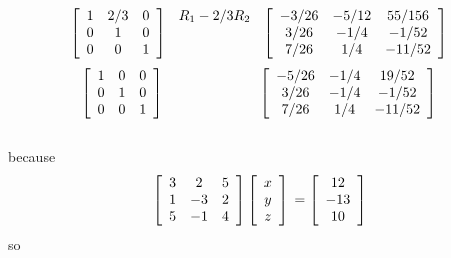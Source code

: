 \documentclass[a4paper, 12pt]{article}
\begin{document}
\[
\left[{
\begin{array}{ccc}
1 & 2/3 & 0 \\
0 & 1  & 0 \\
0 & 0  & 1
\end{array}
}
\right]
\begin{array}{ccc}
R_1 - 2/3 R_2 \\
\ \ \ \ \ \ \ \ \ \ \ \ \ \ \ \ \  \\
\ \ \ \ \ \ \ \ \ \ \ \ \ \ \ \ \  
\end{array}
\left[{
\begin{array}{ccc}
-3/26 & -5/12 & 55/156\\
3/26 & -1/4 & -1/52\\
7/26 & 1/4 & -11/52
\end{array} 
}
\right]\\ 
\] 
\[
\left[{
\begin{array}{ccc}
1 & 0 & 0 \\
0 & 1  & 0 \\
0 & 0  & 1
\end{array}
}
\right]
\begin{array}{ccc} 
\ \ \ \ \ \ \ \ \ \ \ \ \ \ \ \ \  \\
\ \ \ \ \ \ \ \ \ \ \ \ \ \ \ \ \  \\
\ \ \ \ \ \ \ \ \ \ \ \ \ \ \ \ \  
\end{array}
\left[{
\begin{array}{ccc}
-5/26 & -1/4 & 19/52\\
3/26 & -1/4 & -1/52\\
7/26 & 1/4 & -11/52
\end{array} 
} \right]\\ 
\] 
\\
because
\[
\left[{
\begin{array}{ccc}
3 & 2 & 5 \\
1 & -3  & 2\\
5 & -1  & 4
\end{array}
} \right]
\left[{
\begin{array}{c}
x \\
y \\
z
\end{array} 
} \right]\\ 
=
\left[{
\begin{array}{c} 
12 \\
-13 \\
10
\end{array}
} \right]
\] 
so
\end{document}
